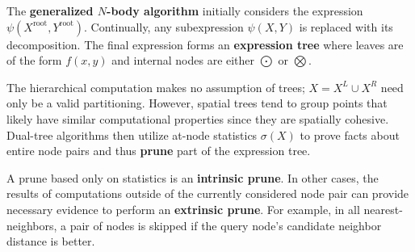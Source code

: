 \documentclass[twoside,leqno,twocolumn]{article}
\newcommand{\union}{\cup}
\newcommand{\summary}{\delta}
\newcommand{\gnp}{\psi}
\newcommand{\defterm}[1]{{\bf #1}}
\newcommand{\kdroot}[1]{#1^{\text{root}}}
\newcommand{\kdleft}[1]{#1^{\!L}}
\newcommand{\kdright}[1]{#1^{\!R}}
\newcommand{\outstat}{\sigma}
\begin{document}
The \defterm{generalized $N$-body algorithm} initially considers the expression $\gnp(\kdroot{X}, \kdroot{Y})$.
Continually, any subexpression $\gnp(X, Y)$ is replaced with its decomposition.
The final expression forms an \defterm{expression tree} where leaves are of the form $f(x,y)$ and internal nodes are either $\bigodot$ or $\bigotimes$.

The hierarchical computation makes no assumption of trees; $X = \kdleft{X} \union \kdright{X}$ need only be a valid partitioning.
However, spatial trees tend to group points that likely have similar computational properties since they are spatially cohesive.
Dual-tree algorithms then utilize at-node statistics $\outstat(X)$ to prove facts about entire node pairs and thus \defterm{prune} part of the expression tree.

A prune based only on statistics is an \defterm{intrinsic prune}.
In other cases, the results of computations outside of the currently considered node pair can provide necessary evidence to perform an \defterm{extrinsic prune}.
For example, in all nearest-neighbors, a pair of nodes is skipped if the query node's candidate neighbor distance is better.


\end{document}
